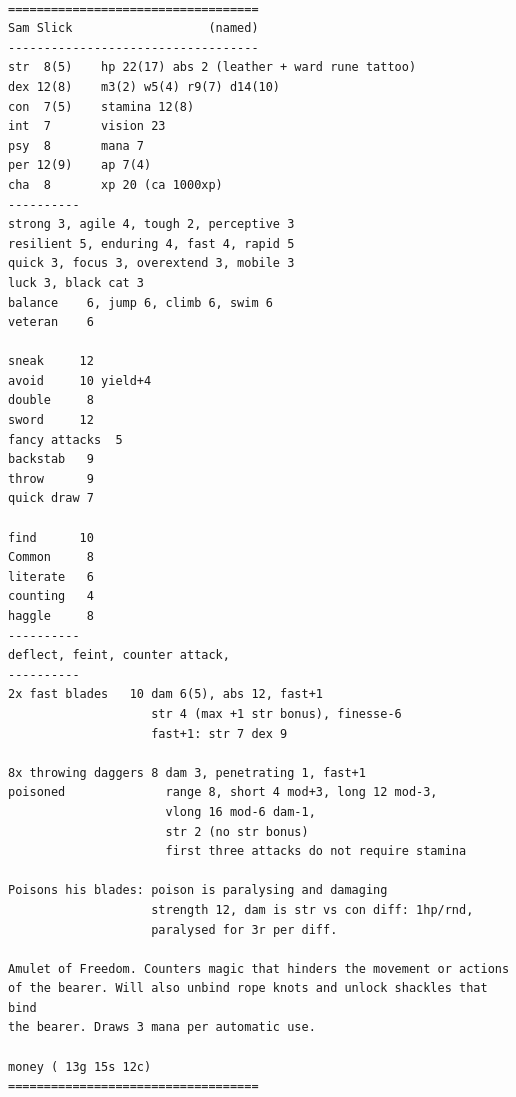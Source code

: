 \

\goodbreak \begin{samepage} \vsmall \begin{verbatim}
===================================
Sam Slick                   (named)
-----------------------------------
str  8(5)    hp 22(17) abs 2 (leather + ward rune tattoo)
dex 12(8)    m3(2) w5(4) r9(7) d14(10)
con  7(5)    stamina 12(8)
int  7       vision 23
psy  8       mana 7
per 12(9)    ap 7(4)
cha  8       xp 20 (ca 1000xp)
----------
strong 3, agile 4, tough 2, perceptive 3
resilient 5, enduring 4, fast 4, rapid 5
quick 3, focus 3, overextend 3, mobile 3
luck 3, black cat 3
balance    6, jump 6, climb 6, swim 6
veteran    6

sneak     12
avoid     10 yield+4
double     8
sword     12
fancy attacks  5
backstab   9
throw      9
quick draw 7

find      10
Common     8
literate   6
counting   4
haggle     8
----------
deflect, feint, counter attack,
----------
2x fast blades   10 dam 6(5), abs 12, fast+1
                    str 4 (max +1 str bonus), finesse-6
                    fast+1: str 7 dex 9

8x throwing daggers 8 dam 3, penetrating 1, fast+1
poisoned              range 8, short 4 mod+3, long 12 mod-3,
                      vlong 16 mod-6 dam-1,
                      str 2 (no str bonus)
                      first three attacks do not require stamina

Poisons his blades: poison is paralysing and damaging
                    strength 12, dam is str vs con diff: 1hp/rnd,
                    paralysed for 3r per diff.

Amulet of Freedom. Counters magic that hinders the movement or actions
of the bearer. Will also unbind rope knots and unlock shackles that bind
the bearer. Draws 3 mana per automatic use.

money ( 13g 15s 12c)
===================================
\end{verbatim} \normalsize \end{samepage}

\

\flushbottom















